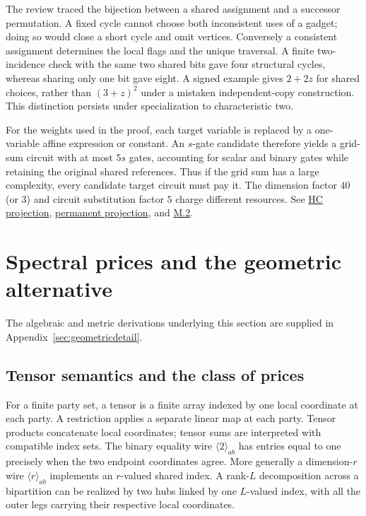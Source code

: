 \documentclass[11pt,letterpaper]{article}
\theoremstyle{definition}\newtheorem{definition}[theorem]{Definition}\newtheorem{example}[theorem]{Example}
\theoremstyle{remark}\newtheorem{remark}[theorem]{Remark}
\newcommand{\pub}[3]{\href{https://github.com/anthropics/formal-math/blob/11b6c7e3c927df2658f513b6b68ea7f8929c62c5/vp-vnp/#1\#L#2}{#3}}
\newcommand{\aud}[2]{\href{https://github.com/nousentllc/VP-VNP-Review/blob/567303d0bcf4f9d54390437b137752446e58ccd6/#1}{#2}}
\begin{document}
The review traced the bijection between a shared assignment and a successor permutation. A fixed cycle cannot choose both inconsistent uses of a gadget; doing so would close a short cycle and omit vertices. Conversely a consistent assignment determines the local flags and the unique traversal. A finite two-incidence check with the same two shared bits gave four structural cycles, whereas sharing only one bit gave eight. A signed example gives $2+2z$ for shared choices, rather than $(3+z)^2$ under a mistaken independent-copy construction. This distinction persists under specialization to characteristic two.

For the weights used in the proof, each target variable is replaced by a one-variable affine expression or constant. An $s$-gate candidate therefore yields a grid-sum circuit with at most $5s$ gates, accounting for scalar and binary gates while retaining the original shared references. Thus if the grid sum has a large complexity, every candidate target circuit must pay it. The dimension factor $40$ (or $3$) and circuit substitution factor $5$ charge different resources. See \aud{passes/12b-hamiltonian-projection.md}{HC projection}, \aud{passes/pass13C-permanent.md}{permanent projection}, and \pub{Paper/HcGrid.lean}{18}{M.2}.

\section{Spectral prices and the geometric alternative}\label{sec:geometry}
The algebraic and metric derivations underlying this section are supplied in Appendix~\ref{sec:geometricdetail}.
\subsection{Tensor semantics and the class of prices}
For a finite party set, a tensor is a finite array indexed by one local coordinate at each party. A restriction applies a separate linear map at each party. Tensor products concatenate local coordinates; tensor sums are interpreted with compatible index sets. The binary equality wire $\langle 2\rangle_{ab}$ has entries equal to one precisely when the two endpoint coordinates agree. More generally a dimension-$r$ wire $\langle r\rangle_{ab}$ implements an $r$-valued shared index. A rank-$L$ decomposition across a bipartition can be realized by two hubs linked by one $L$-valued index, with all the outer legs carrying their respective local coordinates.
\end{document}

